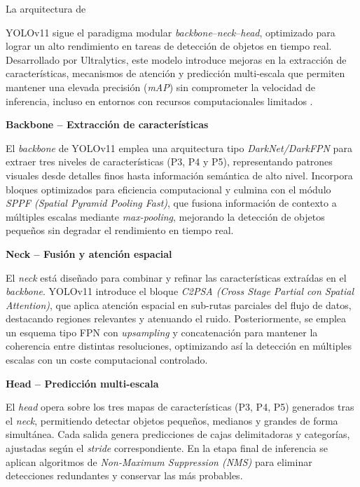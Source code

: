 La arquitectura de {YOLOv11 sigue el paradigma modular \textit{backbone}--\textit{neck}--\textit{head}, optimizado para lograr un alto rendimiento en tareas de detección de objetos en tiempo real. Desarrollado por Ultralytics, este modelo introduce mejoras en la extracción de características, mecanismos de atención y predicción multi-escala que permiten mantener una elevada precisión (\textit{mAP}) sin comprometer la velocidad de inferencia, incluso en entornos con recursos computacionales limitados \cite{analyticsvidhya2025}.

\textbf{Backbone – Extracción de características}

El \textit{backbone} de YOLOv11 emplea una arquitectura tipo \textit{DarkNet/DarkFPN} para extraer tres niveles de características (P3, P4 y P5), representando patrones visuales desde detalles finos hasta información semántica de alto nivel. Incorpora bloques optimizados para eficiencia computacional y culmina con el módulo \textit{SPPF (Spatial Pyramid Pooling Fast)}, que fusiona información de contexto a múltiples escalas mediante \textit{max-pooling}, mejorando la detección de objetos pequeños sin degradar el rendimiento en tiempo real.

\textbf{Neck – Fusión y atención espacial}

El \textit{neck} está diseñado para combinar y refinar las características extraídas en el \textit{backbone}. YOLOv11 introduce el bloque \textit{C2PSA (Cross Stage Partial con Spatial Attention)}, que aplica atención espacial en sub-rutas parciales del flujo de datos, destacando regiones relevantes y atenuando el ruido. Posteriormente, se emplea un esquema tipo FPN con \textit{upsampling} y concatenación para mantener la coherencia entre distintas resoluciones, optimizando así la detección en múltiples escalas con un coste computacional controlado.

\textbf{Head – Predicción multi-escala}

El \textit{head} opera sobre los tres mapas de características (P3, P4, P5) generados tras el \textit{neck}, permitiendo detectar objetos pequeños, medianos y grandes de forma simultánea. Cada salida genera predicciones de cajas delimitadoras y categorías, ajustadas según el \textit{stride} correspondiente. En la etapa final de inferencia se aplican algoritmos de \textit{Non-Maximum Suppression (NMS)} para eliminar detecciones redundantes y conservar las más probables.

\vspace*{-0.5 cm}


}
